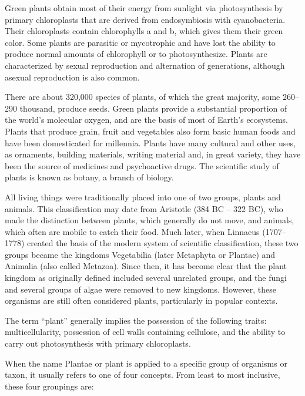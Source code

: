 Green plants obtain most of their energy from sunlight via photosynthesis by primary chloroplasts that are derived from endosymbiosis with cyanobacteria. Their chloroplasts contain chlorophylls a and b, which gives them their green color. Some plants are parasitic or mycotrophic and have lost the ability to produce normal amounts of chlorophyll or to photosynthesize. Plants are characterized by sexual reproduction and alternation of generations, although asexual reproduction is also common.

There are about 320,000 species of plants, of which the great majority, some 260--290 thousand, produce seeds. Green plants provide a substantial proportion of the world's molecular oxygen, and are the basis of most of Earth's ecosystems. Plants that produce grain, fruit and vegetables also form basic human foods and have been domesticated for millennia. Plants have many cultural and other uses, as ornaments, building materials, writing material and, in great variety, they have been the source of medicines and psychoactive drugs. The scientific study of plants is known as botany, a branch of biology.

All living things were traditionally placed into one of two groups, plants and animals. This classification may date from Aristotle (384 BC -- 322 BC), who made the distinction between plants, which generally do not move, and animals, which often are mobile to catch their food. Much later, when Linnaeus (1707--1778) created the basis of the modern system of scientific classification, these two groups became the kingdoms Vegetabilia (later Metaphyta or Plantae) and Animalia (also called Metazoa). Since then, it has become clear that the plant kingdom as originally defined included several unrelated groups, and the fungi and several groups of algae were removed to new kingdoms. However, these organisms are still often considered plants, particularly in popular contexts.

The term ``plant'' generally implies the possession of the following traits: multicellularity, possession of cell walls containing cellulose, and the ability to carry out photosynthesis with primary chloroplasts.

When the name Plantae or plant is applied to a specific group of organisms or taxon, it usually refers to one of four concepts. From least to most inclusive, these four groupings are:

\onecolumn

